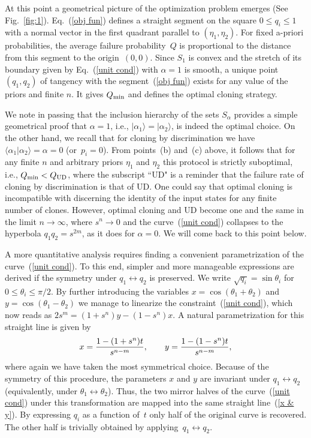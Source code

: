 \documentclass[aps,prl,twocolumn,showpacs]{revtex4}
\begin{document}
At this point a geometrical picture of the optimization problem emerges (See Fig.~\ref{fig:1}). 
Eq.~(\ref{obj fun}) defines a straight segment  on the square $0\le q_i\le 1$ with a normal vector in the first quadrant parallel to $(\eta_1,\eta_2)$. For fixed a-priori probabilities, the average failure probability~$Q$ is proportional to the distance from this segment to the origin~$(0,0)$. 
Since $S_1$ is convex and the stretch of its boundary given by Eq.~(\ref{unit cond}) with $\alpha=1$ is smooth, a unique point $(q_1,q_2)$ of tangency with the segment~(\ref{obj fun}) exists for any value of the priors and finite $n$.
It gives $Q_{\rm min}$ and defines the optimal cloning strategy. %

We note in passing that the inclusion hierarchy of the sets $S_\alpha$ provides a simple geometrical proof that $\alpha=1$, i.e., $|\alpha_1\rangle=|\alpha_2\rangle$, is indeed the optimal choice.
%
On the other hand, we recall that for cloning by discrimination we have $\langle\alpha_1|\alpha_2\rangle=\alpha=0$ (or~$p_i=0$). From points~(b) and~(c) above, it follows that for any finite $n$ and arbitrary priors $\eta_1$ and $\eta_2$ this protocol is strictly suboptimal, i.e., $Q_{\rm min}<Q_{\rm UD}$, where the subscript ``UD" is a reminder that the failure rate of cloning by discrimination is that of UD. One could say that optimal cloning is incompatible with discerning the identity of the input states for any finite number of clones. However, optimal cloning and UD become one and the same in the limit $n\to \infty$, where $s^n\to 0$ and the curve~(\ref{unit cond}) collapses to the hyperbola $q_1 q_2=s^{2m}$, as it does for $\alpha=0$. We will come back to this point below.
%

A more quantitative analysis requires finding a convenient parametrization of the curve~(\ref{unit cond}). To this end, simpler and more manageable expressions are derived if the symmetry under $q_1\leftrightarrow q_2$ is preserved. We write $\sqrt{q_i} = \sin \theta_i$ for $0\leq \theta_i \leq \pi/2$. By further introducing the variables $x =\cos(\theta_1+\theta_2)$ and $y = \cos (\theta_1 - \theta_2)$ we manage to linearize the constraint~(\ref{unit cond}),
which now reads as $2s^m=(1+s^n)y-(1-s^n)x$. A natural parametrization for this straight line is given by 
%
\begin{equation}
x={1-(1+s^n)t\over s^{n-m}},\qquad y={1-(1-s^n)t \over s^{n-m}},
\label{x & y}
\end{equation}
%
where again we have taken the most symmetrical choice.
%
%
Because of the symmetry of this procedure, the parameters $x$ and $y$ are invariant under $q_1\leftrightarrow q_2$ (equivalently, under $\theta_1\leftrightarrow \theta_2$). Thus, the two mirror halves of the curve~(\ref{unit cond}) under this transformation are mapped into the same straight line~(\ref{x & y}). By expressing $q_i$ as a function of~$t$ only half of the original curve is recovered. The other half is trivially obtained by applying~$q_1\leftrightarrow q_2$.
\end{document}
